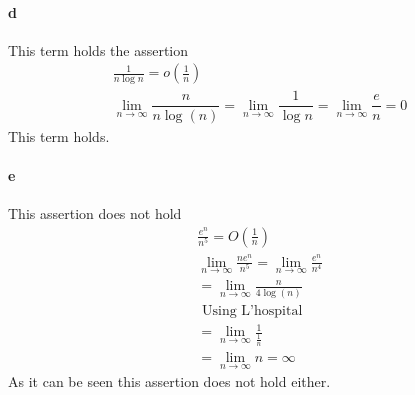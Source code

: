 \paragraph{d}
This term holds the assertion
\begin{gather*}
\frac{1}{n \log n} = o(\frac{1}{n}) \\
\lim_{n \to \infty} \dfrac{n}{n \log(n)} =  \lim_{n \to \infty}  \dfrac{1}{\log n} = \lim_{n \to \infty} \dfrac{e}{n} = 0 
\end{gather*}
This term holds.
\paragraph{e}
This assertion does not hold
\begin{gather*}
\frac{e^n}{n^5} = O(\frac{1}{n})\\
\lim_{n \to \infty} \frac{n e^n}{n^5} = \lim_{n \to \infty} \frac{e^n}{n^4} \\
= \lim_{n \to \infty} \frac{n}{4 \log (n)} \\
\text{ Using L'hospital } \\
= \lim_{n \to \infty} \frac{1}{\frac{1}{n}}\\
= \lim_{n \to \infty} n = \infty
\end{gather*}
As it can be seen this assertion does not hold either.
